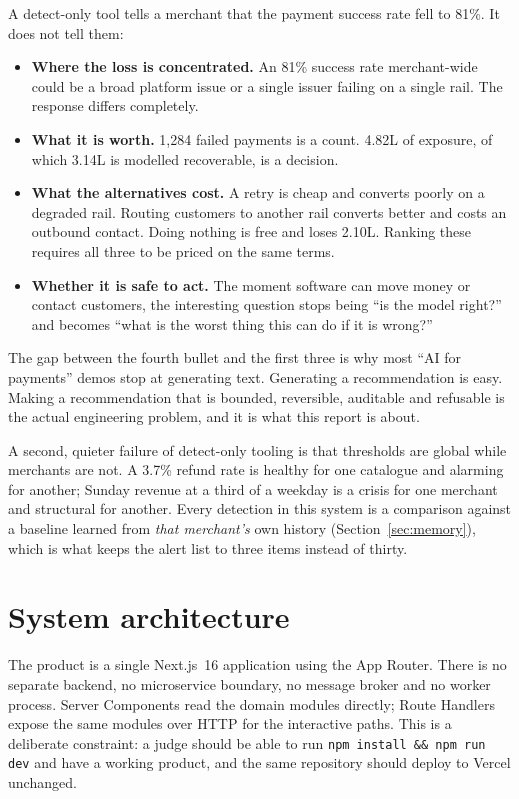 \documentclass[10pt,twocolumn,a4paper]{article}
\newcommand{\rs}{\rupee}%
\newcommand{\rs}{\textrm{INR}\,}%
\newcommand{\code}[1]{\texttt{\small #1}}
\begin{document}
A detect-only tool tells a merchant that the payment success rate fell to 81\%.
It does not tell them:

\begin{itemize}
  \item \textbf{Where the loss is concentrated.} An 81\% success rate merchant-wide
    could be a broad platform issue or a single issuer failing on a single rail.
    The response differs completely.
  \item \textbf{What it is worth.} 1{,}284 failed payments is a count. \rs{}4.82L
    of exposure, of which \rs{}3.14L is modelled recoverable, is a decision.
  \item \textbf{What the alternatives cost.} A retry is cheap and converts
    poorly on a degraded rail. Routing customers to another rail converts better
    and costs an outbound contact. Doing nothing is free and loses \rs{}2.10L.
    Ranking these requires all three to be priced on the same terms.
  \item \textbf{Whether it is safe to act.} The moment software can move money or
    contact customers, the interesting question stops being ``is the model
    right?'' and becomes ``what is the worst thing this can do if it is wrong?''
\end{itemize}

The gap between the fourth bullet and the first three is why most ``AI for
payments'' demos stop at generating text. Generating a recommendation is easy.
Making a recommendation that is bounded, reversible, auditable and refusable is
the actual engineering problem, and it is what this report is about.

A second, quieter failure of detect-only tooling is that thresholds are global
while merchants are not. A 3.7\% refund rate is healthy for one catalogue and
alarming for another; Sunday revenue at a third of a weekday is a crisis for one
merchant and structural for another. Every detection in this system is a
comparison against a baseline learned from \emph{that merchant's} own history
(Section~\ref{sec:memory}), which is what keeps the alert list to three items
instead of thirty.

\section{System architecture}
\label{sec:arch}

The product is a single Next.js~16 application using the App Router. There is no
separate backend, no microservice boundary, no message broker and no worker
process. Server Components read the domain modules directly; Route Handlers
expose the same modules over HTTP for the interactive paths. This is a
deliberate constraint: a judge should be able to run \code{npm install \&\&
npm run dev} and have a working product, and the same repository should deploy to
Vercel unchanged.
\end{document}
